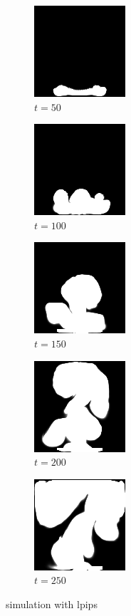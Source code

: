 \documentclass[a4paper,12pt,twoside]{report}
\begin{document}
\begin{figure}
\centering
\begin{subfigure}{0.18\textwidth}
  \centering
  \includegraphics[scale=0.56]{buoyancy_test/dens_000050_lpips.png}
  \caption{$t=50$}
\end{subfigure}
\begin{subfigure}{0.18\textwidth}
  \centering
  \includegraphics[scale=0.56]{buoyancy_test/dens_000100_lpips.png}
  \caption{$t=100$}
\end{subfigure}
\begin{subfigure}{0.18\textwidth}
  \centering
  \includegraphics[scale=0.56]{buoyancy_test/dens_000150_lpips.png}
  \caption{$t=150$}
\end{subfigure}
\begin{subfigure}{0.18\textwidth}
  \centering
  \includegraphics[scale=0.56]{buoyancy_test/dens_000200_lpips.png}
  \caption{$t=200$}
\end{subfigure}
\begin{subfigure}{0.18\textwidth}
  \centering
  \includegraphics[scale=0.56]{buoyancy_test/dens_000249_lpips.png}
  \caption{$t=250$}
\end{subfigure}
\caption{simulation with lpips}
\label{sol buoyancy high lpips}
\end{figure}
\end{document}
